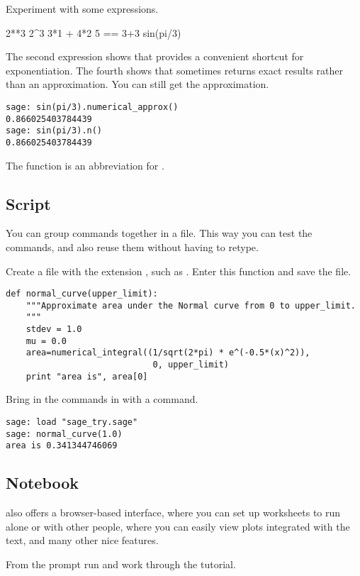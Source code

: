 Experiment with some expressions.
\begin{sageoutput}
2**3                                                                      
2^3
3*1 + 4*2
5 == 3+3
sin(pi/3)
\end{sageoutput}
The second expression 
shows that \Sage{} provides a convenient shortcut for exponentiation.
The fourth shows that \Sage{} sometimes returns exact results rather than an
approximation.
You can still get the approximation. 
\begin{lstlisting}[style=python]
sage: sin(pi/3).numerical_approx()
0.866025403784439
sage: sin(pi/3).n()
0.866025403784439  
\end{lstlisting}
The function  is an abbreviation for 
.


\subsection{Script}
You can group \Sage{} commands together in a file.
This way you can test the commands, 
and also reuse them without having to retype.

Create a file with the extension , such as .
Enter this function and save the file.
\begin{lstlisting}[style=python]
def normal_curve(upper_limit):
    """Approximate area under the Normal curve from 0 to upper_limit.
    """
    stdev = 1.0
    mu = 0.0
    area=numerical_integral((1/sqrt(2*pi) * e^(-0.5*(x)^2)),
                             0, upper_limit)    
    print "area is", area[0]
\end{lstlisting}
Bring in the commands in with a  command.
\begin{lstlisting}[style=python]
sage: load "sage_try.sage"
sage: normal_curve(1.0)   
area is 0.341344746069  
\end{lstlisting}


\subsection{Notebook}
\Sage{} also offers a browser-based interface, where you can set up
worksheets to run alone or with other people, where you can easily
view plots integrated with the text, and many other nice features.

From the \Sage{} prompt run  and
work through the tutorial.
\endinput


TODO:
  1) how to use notebook to do exercises?